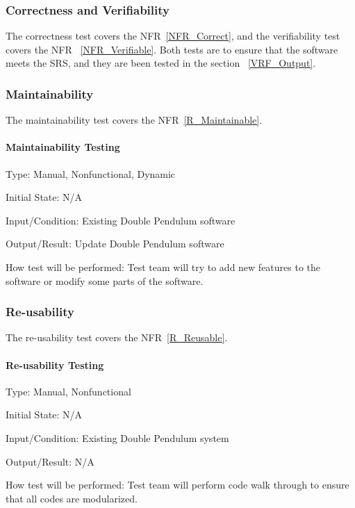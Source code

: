 \documentclass[12pt, titlepage]{article}
\begin{document}
\subsubsection{Correctness and Verifiability}\label{CnV}
		
The correctness test covers the NFR~\ref{NFR_Correct}, and the verifiability
test covers the NFR ~\ref{NFR_Verifiable}. Both tests are to ensure that the
software meets the SRS, and they are been tested in the section
~\ref{VRF_Output}.

\subsubsection{Maintainability}\label{MainTest}
The maintainability test covers the NFR~\ref{R_Maintainable}. 
\paragraph{Maintainability Testing\\} 

Type: Manual, Nonfunctional, Dynamic
          
Initial State: N/A
          
Input/Condition: Existing Double Pendulum software
          
Output/Result: Update Double Pendulum software
          
How test will be performed: Test team will try to add new features to the
software or modify some parts of the software. 

\subsubsection{Re-usability}\label{ReuseTest}
The re-usability test covers the NFR~\ref{R_Reusable}. 

\paragraph{Re-usability Testing\\}
Type: Manual, Nonfunctional

Initial State: N/A
          
Input/Condition: Existing Double Pendulum system
          
Output/Result: N/A
          
How test will be performed: Test team will perform code walk through to ensure
that all codes are modularized. 
\end{document}
